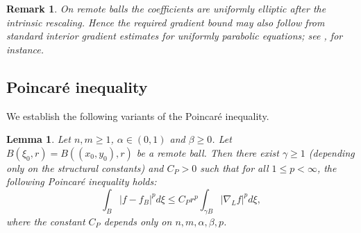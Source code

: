 \documentclass[12pt]{amsart}
\newtheorem{lemma}[theorem]{Lemma}
\newtheorem{remark}[theorem]{Remark}
\begin{document}
\begin{remark}
On remote balls the coefficients are uniformly elliptic after the intrinsic rescaling. Hence the required gradient bound may also follow from standard interior gradient estimates for uniformly parabolic equations; see \cite{Lieberman}, for instance.
\end{remark}







\subsection{Poincar\'e inequality}

We establish the following variants of the Poincar\'e inequality.


\begin{lemma}\label{PE}
Let $n,m\ge 1$, $\alpha\in (0,1)$ and $\beta\ge 0$. Let $B(\xi_0, r) = B((x_0,y_0), r)$ be a remote ball. Then there exist $\gamma \ge 1$ (depending only on the structural constants) and $C_P>0$ such that for all $1\le p < \infty$, the following Poincar\'e inequality holds:
\begin{equation}
    \int_B |f-f_B|^p d\xi \le C_P r^p \int_{\gamma B} |\nabla_L f|^p d\xi,
\end{equation}
where the constant $C_P$ depends only on $n,m,\alpha,\beta,p$.
\end{lemma}
\end{document}
